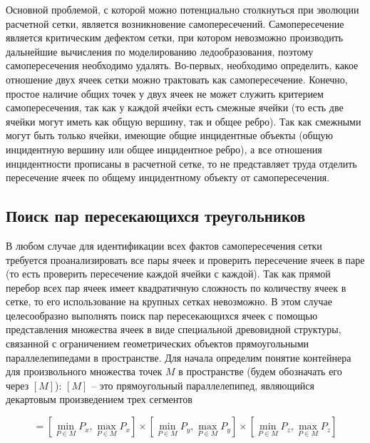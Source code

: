 Основной проблемой, с которой можно потенциально столкнуться при эволюции расчетной сетки, является возникновение самопересечений.
Самопересечение является критическим дефектом сетки, при котором невозможно производить дальнейшие вычисления по моделированию ледообразования, поэтому самопересечения необходимо удалять.
Во-первых, необходимо определить, какое отношение двух ячеек сетки можно трактовать как самопересечение.
Конечно, простое наличие общих точек у двух ячеек не может служить критерием самопересечения, так как у каждой ячейки есть смежные ячейки (то есть две ячейки могут иметь как общую вершину, так и общее ребро).
Так как смежными могут быть только ячейки, имеющие общие инцидентные объекты (общую инцидентную вершину или общее инцидентное ребро), а все отношения инцидентности прописаны в расчетной сетке, то не представляет труда отделить пересечение ячеек по общему инцидентному объекту от самопересечения.

\subsection{Поиск пар пересекающихся треугольников}

В любом случае для идентификации всех фактов самопересечения сетки требуется проанализировать все пары ячеек и проверить пересечение ячеек в паре (то есть проверить пересечение каждой ячейки с каждой).
Так как прямой перебор всех пар ячеек имеет квадратичную сложность по количеству ячеек в сетке, то его использование на крупных сетках невозможно.
В этом случае целесообразно выполнять поиск пар пересекающихся ячеек с помощью представления множества ячеек в виде специальной древовидной структуры, связанной с ограничением геометрических объектов прямоугольными параллелепипедами в пространстве.
Для начала определим понятие контейнера для произвольного множества точек $M$ в пространстве (будем обозначать его через $[M]$): $[M]$ -- это прямоугольный параллелепипед, являющийся декартовым произведением трех сегментов

\begin{equation}
[M] = \left[\min_{P \in M}{P_x}, \max_{P \in M}{P_x}\right]
      \times \left[\min_{P \in M}{P_y}, \max_{P \in M}{P_y}\right]
      \times \left[\min_{P \in M}{P_z}, \max_{P \in M}{P_z}\right]
\end{equation}

